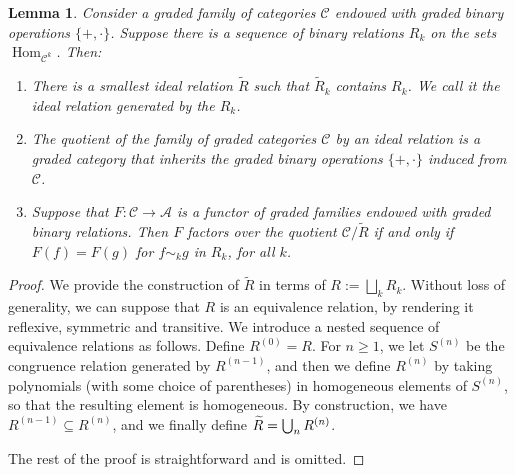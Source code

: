 \documentclass[JEP,XML,SOM,Unicode,published]{cedram}
\theoremstyle{plain}
\newtheorem{lemma}[theorem]{Lemma}
\theoremstyle{definition}
\newcommand{\Acal}{\mathcal A}
\newcommand{\Ccal}{\mathcal C}
\DeclareMathOperator{\Hom}{Hom}
\begin{document}
\begin{lemma}\label{lemma:ideal-relation}
Consider a graded family of categories $\Ccal$ endowed with graded binary operations $\{+, \cdot \}$. Suppose there is a sequence of binary relations $R_{k}$ on the sets $\Hom_{\Ccal^k}$. Then:
\begin{enumerate}
\item\label{lemma:ideal-relation-1} There is a smallest ideal relation $\widetilde{R}$ such that $\widetilde{R}_{k}$ contains $R_{k}$. We call it the ideal relation generated by the $R_k$.
\item\label{lemma:ideal-relation-2} The quotient of the family of graded categories $\Ccal$ by an ideal relation is a graded category that inherits the graded binary operations $\{+,\cdot \}$ induced from $\Ccal$.
\item\label{lemma:ideal-relation-3} Suppose that $F: \Ccal \to \Acal$ is a functor of graded families endowed with graded binary relations. Then $F$ factors over the quotient $\Ccal/\widetilde{R}$ if and only if $F(f)=F(g)$ for $f \sim_k g$ in $R_{k}$, for all $k$.
\end{enumerate}
\end{lemma}
\begin{proof}
We provide the construction of $\widetilde{R}$ in terms of $R:=\bigsqcup_{k}R_{k}$. Without loss of generality, we can suppose that $R$ is an equivalence relation, by rendering it reflexive, symmetric and transitive. We introduce a nested sequence of equivalence relations as follows. Define $R^{(0)}=R$. For $n\geq 1$, we let $S^{(n)}$ be the congruence relation generated by $R^{(n-1)}$, and then we define $R^{(n)}$ by taking polynomials (with some choice of parentheses) in homogeneous elements of $S^{(n)}$, so that the resulting element is homogeneous. By construction, we have $R^{(n-1)}\subseteq R^{(n)}$, and we finally define $\widetilde{R}=\nobreak\bigcup_{n}R^{(n)}$.

The rest of the proof is straightforward and is omitted.
\end{proof}
\end{document}
